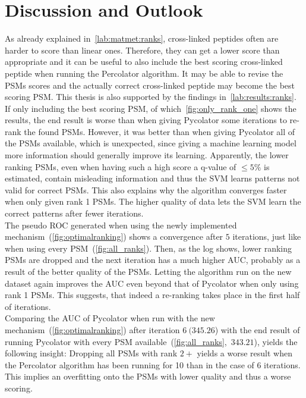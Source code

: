 
\chapter{Discussion and Outlook}
\label{discussion}
As already explained in~\ref{lab:matmet:ranks}, cross-linked peptides often are harder to score than linear ones. Therefore, they can get a lower score than appropriate and it can be useful to also include the best scoring cross-linked peptide when running the Percolator algorithm. It may be able to revise the PSMs scores and the actually correct cross-linked peptide may become the best scoring PSM. This thesis is also supported by the findings in~\ref{lab:results:ranks}. If only including the best scoring PSM, of which~\ref{fig:only_rank_one} shows the results, the end result is worse than when giving Pycolator some iterations to re-rank the found PSMs. However, it was better than when giving Pycolator all of the PSMs available, which is unexpected, since giving a machine learning model more information should generally improve its learning. Apparently, the lower ranking PSMs, even when having such a high score a q-value of $\leq5\%$ is estimated, contain misleading information and thus the SVM learns patterns not valid for correct PSMs. This also explains why the algorithm converges faster when only given rank 1 PSMs. The higher quality of data lets the SVM learn the correct patterns after fewer iterations. \\
The pseudo ROC generated when using the newly implemented mechanism~(\ref{fig:optimalranking}) shows a convergence after $5$ iterations, just like when using every PSM~(\ref{fig:all_ranks}). Then, as the log shows, lower ranking PSMs are dropped and the next iteration has a much higher AUC, probably as a result of the better quality of the PSMs. Letting the algorithm run on the new dataset again improves the AUC even beyond that of Pycolator when only using rank 1 PSMs. This suggests, that indeed a re-ranking takes place in the first half of iterations.\\
Comparing the AUC of Pycolator when run with the new mechanism~(\ref{fig:optimalranking}) after iteration $6~(345.26$) with the end result of running Pycolator with every PSM available~(\ref{fig:all_ranks},~$343.21$), yields the following insight: Dropping all PSMs with rank $2+$ yields a worse result when the Percolator algorithm has been running for 10 than in the case of 6 iterations. This implies an overfitting onto the PSMs with lower quality and thus a worse scoring.\\\\

